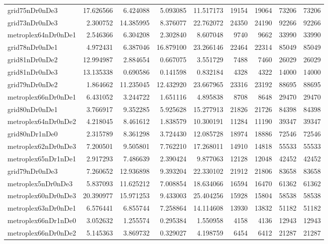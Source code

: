 \begin{longtable}{|l|r|r|r|r|r|r|r|r|}
grid75nDr0nDe3 & 17.626566 & 6.424088 & 5.093085 & 11.517173 & 19154 & 19064 & 73206 & 73206 \\
grid73nDr0nDe3 & 2.300752 & 14.385995 & 8.376077 & 22.762072 & 24350 & 24190 & 92266 & 92266 \\
metroplex64nDr0nDe1 & 2.546366 & 6.304208 & 2.302840 & 8.607048 & 9740 & 9662 & 33990 & 33990 \\
grid78nDr0nDe1 & 4.972431 & 6.387046 & 16.879100 & 23.266146 & 22464 & 22314 & 85049 & 85049 \\
grid81nDr0nDe2 & 12.994987 & 2.884654 & 0.667075 & 3.551729 & 7488 & 7460 & 26029 & 26029 \\
grid81nDr0nDe3 & 13.135338 & 0.690586 & 0.141598 & 0.832184 & 4328 & 4322 & 14000 & 14000 \\
grid79nDr0nDe2 & 1.864662 & 11.235045 & 12.432920 & 23.667965 & 23316 & 23192 & 88695 & 88695 \\
metroplex66nDr0nDe1 & 6.431052 & 3.244722 & 1.651116 & 4.895838 & 8708 & 8648 & 29470 & 29470 \\
grid80nDr0nDe1 & 3.766917 & 9.352285 & 5.925628 & 15.277913 & 21826 & 21726 & 84398 & 84398 \\
metroplex64nDr0nDe2 & 4.218045 & 8.461612 & 1.838579 & 10.300191 & 11284 & 11190 & 39347 & 39347 \\
grid80nDr1nDe0 & 2.315789 & 8.361298 & 3.724430 & 12.085728 & 18974 & 18886 & 72546 & 72546 \\
metroplex62nDr0nDe3 & 7.200501 & 9.505801 & 7.762210 & 17.268011 & 14910 & 14818 & 55533 & 55533 \\
metroplex65nDr1nDe1 & 2.917293 & 7.486639 & 2.390424 & 9.877063 & 12128 & 12048 & 42452 & 42452 \\
grid79nDr0nDe3 & 7.260652 & 12.936898 & 9.393204 & 22.330102 & 21912 & 21806 & 83658 & 83658 \\
metroplex5nDr0nDe3 & 5.837093 & 11.625212 & 7.008854 & 18.634066 & 16594 & 16470 & 61362 & 61362 \\
metroplex60nDr0nDe3 & 20.390977 & 15.971253 & 9.433003 & 25.404256 & 15928 & 15804 & 58538 & 58538 \\
metroplex63nDr0nDe1 & 6.576441 & 6.855744 & 7.258864 & 14.114608 & 13930 & 13832 & 51182 & 51182 \\
metroplex66nDr1nDe0 & 3.052632 & 1.255574 & 0.295384 & 1.550958 & 4158 & 4136 & 12943 & 12943 \\
metroplex66nDr0nDe2 & 5.145363 & 3.869732 & 0.329027 & 4.198759 & 6454 & 6412 & 21287 & 21287 \\

\end{longtable}
